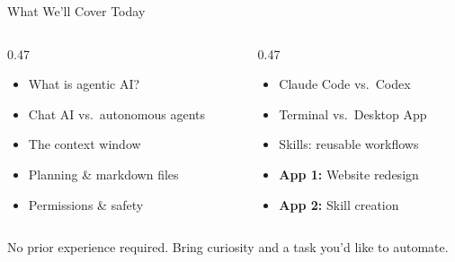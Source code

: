 \documentclass[aspectratio=169, 10pt]{beamer}
\begin{document}
\begin{frame}{What We'll Cover Today}
\begin{columns}[T]
\begin{column}{0.47\textwidth}
\begin{tcolorbox}[keybox, title={\faMap\quad Concepts}]
\small
\begin{itemize}\setlength{\itemsep}{2pt}
  \item What is agentic AI?
  \item Chat AI vs.\ autonomous agents
  \item The context window
  \item Planning \& markdown files
  \item Permissions \& safety
\end{itemize}
\end{tcolorbox}
\end{column}
\begin{column}{0.47\textwidth}
\begin{tcolorbox}[keybox, title={\faLaptopCode\quad Hands-On}]
\small
\begin{itemize}\setlength{\itemsep}{2pt}
  \item Claude Code vs.\ Codex
  \item Terminal vs.\ Desktop App
  \item Skills: reusable workflows
  \item \textbf{App 1:} Website redesign
  \item \textbf{App 2:} Skill creation
\end{itemize}
\end{tcolorbox}
\end{column}
\end{columns}
\vfill
\begin{center}
\color{CoolGray}\small No prior experience required. Bring curiosity and a task you'd like to automate.
\end{center}
\end{frame}
\end{document}
